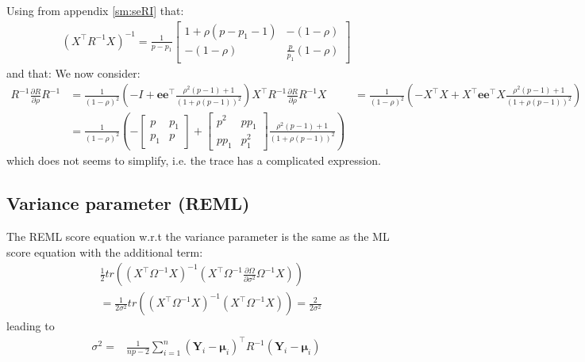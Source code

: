 \documentclass[12pt]{article}
\newcommand\Ve{\mathbf{e}}
\newcommand\VY{\mathbf{Y}}
\newcommand\Vmu{\boldsymbol{\mu}}
\newcommand\trans[1]{{#1}^\intercal}%
\begin{document}
Using from appendix \ref{sm:seRI} that:
\begin{align*}
\left(\trans{X}R^{-1}X\right)^{-1} = \frac{1}{p-p_1} \begin{bmatrix} 1+\rho (p-p_1-1)
                  & -(1-\rho)
                  \\ -(1-\rho)
                  & \frac{p}{p_1}(1-\rho)
                  \end{bmatrix}
\end{align*}
and that:
We now consider:
\begin{align*}
R^{-1} \frac{\partial R}{\partial\rho} R^{-1} &= \frac{1}{(1-\rho)^2} \left(-I + \Ve\trans{\Ve} \frac{\rho^2(p-1) + 1}{(1+\rho(p-1))^2}\right) 
\trans{X}R^{-1} \frac{\partial R}{\partial\rho} R^{-1} X &= \frac{1}{(1-\rho)^2} \left(-\trans{X}X + \trans{X}\Ve\trans{\Ve}X \frac{\rho^2(p-1) + 1}{(1+\rho(p-1))^2}\right)  \\
&= \frac{1}{(1-\rho)^2} \left(-\begin{bmatrix} p
                  & p_1
                  \\ p_1
                  & p
                  \end{bmatrix}
                  + \begin{bmatrix} p^2
                  & p p_1
                  \\ p p_1
                  & p_1^2
                  \end{bmatrix} \frac{\rho^2(p-1) + 1}{(1+\rho(p-1))^2}\right) 
\end{align*}
which does not seems to simplify, i.e. the trace has a complicated expression.

\subsection{Variance parameter (REML)}
\label{sec:orgc951edd}

The REML score equation w.r.t the variance parameter is the same as the ML score equation with the additional term:
\begin{align*}
&\frac{1}{2} tr\left(\left(\trans{X}\Omega^{-1}X\right)^{-1} \left(\trans{X}\Omega^{-1}\frac{\partial \Omega}{\partial\sigma^2}\Omega^{-1}X \right) \right) \\
&= \frac{1}{2\sigma^2} tr\left(\left(\trans{X}\Omega^{-1}X\right)^{-1} \left(\trans{X}\Omega^{-1}X \right) \right) = \frac{2}{2\sigma^2}
\end{align*}
leading to
\begin{align*}
\sigma^2 =& \frac{1}{n p - 2} \sum_{i=1}^n \trans{(\VY_i-\Vmu_i)} R^{-1} (\VY_i-\Vmu_i) 
\end{align*}
\end{document}
